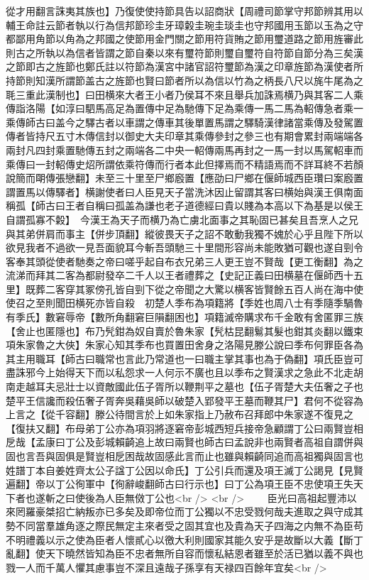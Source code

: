 從才用翻言誅夷其族也】乃復使使持節具告以詔商狀【周禮司節掌守邦節辨其用以輔王命註云節者執以行為信邦節珍圭牙璋糓圭琬圭琰圭也守邦國用玉節以玉為之守都鄙用角節以角為之邦國之使節用金門關之節用符貨賄之節用璽道路之節用旌審此則古之所執以為信者皆謂之節自秦以來有璽符節則璽自璽符自符節自節分為三矣漢之節即古之旌節也鄭氏註以符節為漢宮中諸官詔符璽節為漢之印章旌節為漢使者所持節則知漢所謂節盖古之旌節也賢曰節者所以為信以竹為之柄長八尺以旄牛尾為之毦三重此漢制也】曰田横來大者王小者乃侯耳不來且舉兵加誅焉横乃與其客二人乘傳詣洛陽【如淳曰駟馬高足為置傳中足為馳傳下足為乘傳一馬二馬為軺傳急者乘一乘傳師古曰盖今之驛古者以車謂之傳車其後單置馬謂之驛騎漢律諸當乘傳及發駕置傳者皆持尺五寸木傳信封以御史大夫印章其乘傳參封之參三也有期會累封兩端端各兩封凡四封乘置馳傳五封之兩端各二中央一軺傳兩馬再封之一馬一封以馬駕軺車而乘傳曰一封軺傳史炤所謂依乘符傳而行者本此但擇焉而不精語焉而不詳耳終不若顏說簡而朙傳張戀翻】未至三十里至尸鄉廏置【應劭曰尸鄉在偃師城西臣瓚曰案廏置謂置馬以傳驛者】横謝使者曰人臣見天子當洗沐因止留謂其客曰横始與漢王俱南面稱孤【師古曰王者自稱曰孤盖為謙也老子道德經曰貴以賤為本高以下為基是以侯王自謂孤寡不糓】　今漢王為天子而横乃為亡虜北面事之其恥固已甚矣且吾烹人之兄與其弟併肩而事主【併步頂翻】縱彼畏天子之詔不敢動我獨不媿於心乎且陛下所以欲見我者不過欲一見吾面貌耳今斬吾頭馳三十里間形容尚未能敗猶可觀也遂自剄令客奉其頭從使者馳奏之帝曰嗟乎起自布衣兄弟三人更王豈不賢哉【更工衡翻】為之流涕而拜其二客為都尉發卒二千人以王者禮葬之【史記正義曰田横墓在偃師西十五里】既葬二客穿其冢傍孔皆自剄下從之帝聞之大驚以横客皆賢餘五百人尚在海中使使召之至則聞田横死亦皆自殺　初楚人季布為項籍將【季姓也周八士有季隨季騧魯有季氏】數窘辱帝【數所角翻窘巨隕翻困也】項籍滅帝購求布千金敢有舍匿罪三族【舍止也匿隱也】布乃髠鉗為奴自賣於魯朱家【髠枯昆翻鬄其髮也鉗其炎翻以鐵束項朱家魯之大俠】朱家心知其季布也買置田舍身之洛陽見滕公說曰季布何罪臣各為其主用職耳【師古曰職常也言此乃常道也一曰職主掌其事也為于偽翻】項氏臣豈可盡誅邪今上始得天下而以私怨求一人何示不廣也且以季布之賢漢求之急此不北走胡南走越耳夫忌壯士以資敵國此伍子胥所以鞭荆平之墓也【伍子胥楚大夫伍奢之子也楚平王信讒而殺伍奢子胥奔吳藉吳師以破楚入郢發平王墓而鞭其尸】君何不從容為上言之【從千容翻】滕公待間言於上如朱家指上乃赦布召拜郎中朱家遂不復見之【復扶又翻】布母弟丁公亦為項羽將逐窘帝彭城西短兵接帝急顧謂丁公曰兩賢豈相戹哉【孟康曰丁公及彭城賴齮追上故曰兩賢也師古曰孟說非也兩賢者高祖自謂併與固也言吾與固俱是賢豈相戹困哉故固感此言而止也雖與賴齮同追而高祖獨與固言也姓譜丁本自姜姓齊太公子諡丁公因以命氏】丁公引兵而還及項王滅丁公謁見【見賢遍翻】帝以丁公徇軍中【徇辭峻翻師古曰行示也】曰丁公為項王臣不忠使項王失天下者也遂斬之曰使後為人臣無傚丁公也<br />
<br />
　　臣光曰高祖起豐沛以來罔羅豪桀招亡納叛亦已多矣及即帝位而丁公獨以不忠受戮何哉夫進取之與守成其勢不同當羣雄角逐之際民無定主來者受之固其宜也及貴為天子四海之内無不為臣苟不明禮義以示之使為臣者人懷貳心以徼大利則國家其能久安乎是故斷以大義【斷丁亂翻】使天下曉然皆知為臣不忠者無所自容而懷私結恩者雖至於活已猶以義不與也戮一人而千萬人懼其慮事豈不深且遠哉子孫享有天禄四百餘年宜矣<br />
